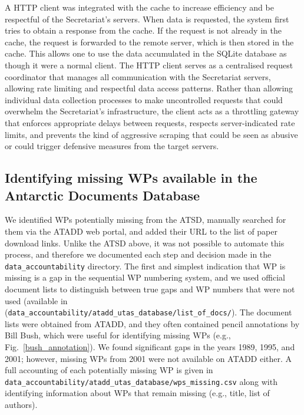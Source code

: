 \documentclass[12pt]{article}
\begin{document}
A HTTP client was integrated with the cache 
to increase efficiency and be respectful of the Secretariat's servers.
When data is requested, the system first tries to obtain a response from the cache.
If the request is not already in the cache, the request is forwarded to the remote server,
which is then stored in the cache.
This allows one to use the data accumulated in the SQLite database as though it were a normal client.
The HTTP client serves as a centralised request coordinator 
that manages all communication with the Secretariat servers, 
allowing rate limiting and respectful data access patterns. 
Rather than allowing individual data collection processes 
to make uncontrolled requests 
that could overwhelm the Secretariat's infrastructure, 
the client acts as a throttling gateway 
that enforces appropriate delays between requests, 
respects server-indicated rate limits, 
and prevents the kind of aggressive scraping 
that could be seen as abusive or could trigger defensive measures from the target servers. 

\subsection{Identifying missing WPs available in the Antarctic Documents Database}
\label{getting_from_ATADD}

We identified WPs potentially missing from the ATSD, 
manually searched for them via the ATADD web portal,
and added their URL to the list of paper download links.
Unlike the ATSD above, it was not possible to automate this process,
and therefore we documented each step and decision made in 
the {\tt data\_accountability} directory.
The first and simplest indication that WP is missing is a gap in the sequential
WP numbering system,
and we used official document lists to distinguish between true gaps
and WP numbers that were not used
(available in ({\tt data\_accountability/atadd\_utas\_database/list\_of\_docs/}).
The document lists were obtained from ATADD,
and they often contained pencil annotations by Bill Bush, 
which were useful for identifying missing WPs (e.g., Fig.~\ref{bush_annotation}).
We found significant gaps in the years 1989, 1995, and 2001;
however, missing WPs from 2001 were not available on ATADD either.
A full accounting of each potentially missing WP is given in
{\tt data\_accountability/atadd\_utas\_database/wps\_missing.csv}
along with identifying information about WPs that remain missing
(e.g., title, list of authors).
\end{document}
